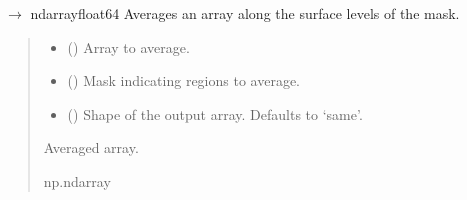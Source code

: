 \documentclass[letterpaper,10pt,english]{sphinxmanual}
\begin{document}
\begin{fulllineitems}
\label{\detokenize{source/stattools:stattools.average_mask}}
\pysigstartsignatures
\pysiglinewithargsret
{}
{\sphinxparamcomma {}\sphinxparamcomma {}}
{{ $\rightarrow$ ndarray\DUrole{p}{{[}}float64\DUrole{p}{{]}}}}
\pysigstopsignatures
\sphinxAtStartPar
Averages an array along the surface levels of the mask.
\begin{quote}\begin{description}
\begin{itemize}
\item {} 
\sphinxAtStartPar
{} () \textendash{} Array to average.

\item {} 
\sphinxAtStartPar
{} (\sphinxstyleliteralemphasis{\sphinxupquote{{[}}}\sphinxstyleliteralemphasis{\sphinxupquote{{]}}}) \textendash{} Mask indicating regions to average.

\item {} 
\sphinxAtStartPar
{} (\sphinxstyleliteralemphasis{\sphinxupquote{, }}) \textendash{} Shape of the output array. Defaults to ‘same’.

\end{itemize}

\sphinxAtStartPar
Averaged array.

\sphinxAtStartPar
np.ndarray

\end{description}\end{quote}

\end{fulllineitems}

\end{document}
